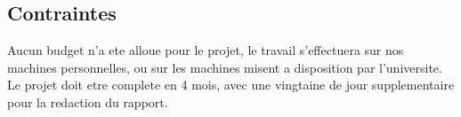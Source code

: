 \subsection{Contraintes}
Aucun budget n'a ete alloue pour le projet, le travail s'effectuera sur nos machines personnelles, ou sur les machines misent a disposition par l'universite.\\
Le projet doit etre complete en 4 mois, avec une vingtaine de jour supplementaire pour la redaction du rapport.\\


\clearpage
